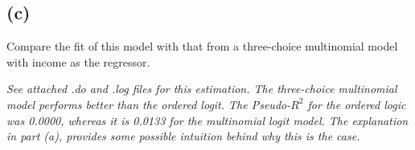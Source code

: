 \documentclass[11pt]{article}
\theoremstyle{definition}
\begin{document}
\subsection*{(c)}
Compare the fit of this model with that from a three-choice multinomial model with income as the regressor.

\textit{See attached .do and .log files for this estimation.  The three-choice multinomial model performs better than the ordered logit.  The Pseudo-$R^2$ for the ordered logic was 0.0000, whereas it is 0.0133 for the multinomial logit model.  The explanation in part (a), provides some possible intuition behind why this is the case.}
\begin{center}

\end{center}

\begin{center}

\end{center}
\end{document}
